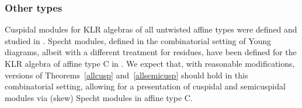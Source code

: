 \documentclass[Unicode,ALCO]{cedram}
\newcommand{\0}{{\bar 0}}
\begin{document}
\subsubsection{Other types}
Cuspidal modules for KLR algebras of all untwisted affine types were defined and studied in \cite{KlCuspSys}. Specht modules, defined in the combinatorial setting of Young diagrams, albeit with a different treatment for residues, have been defined for the KLR algebra of affine type C in \cite{ArPaSpC}. We expect that, with reasonable modifications, versions of Theorems~\ref{allcusp} and~\ref{allsemicusp} should hold in this combinatorial setting, allowing for a presentation of cuspidal and semicuspidal modules via (skew) Specht modules in affine type C.




\end{document}
